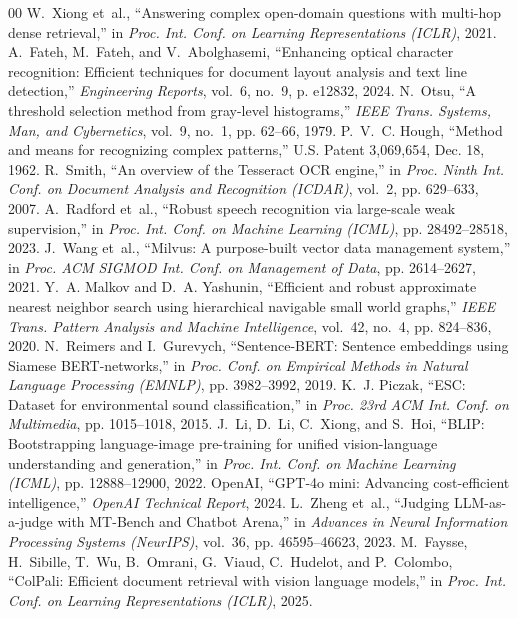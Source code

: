 \documentclass[conference]{IEEEtran}
\begin{document}
\begin{thebibliography}{00}
W.~Xiong et~al., ``Answering complex open-domain questions with multi-hop dense retrieval,'' in \emph{Proc. Int. Conf. on Learning Representations (ICLR)}, 2021.
A.~Fateh, M.~Fateh, and V.~Abolghasemi, ``Enhancing optical character recognition: Efficient techniques for document layout analysis and text line detection,'' \emph{Engineering Reports}, vol.~6, no.~9, p. e12832, 2024.
N.~Otsu, ``A threshold selection method from gray-level histograms,'' \emph{IEEE Trans. Systems, Man, and Cybernetics}, vol.~9, no.~1, pp. 62--66, 1979.
P.~V.~C. Hough, ``Method and means for recognizing complex patterns,'' U.S. Patent 3,069,654, Dec. 18, 1962.
R.~Smith, ``An overview of the Tesseract OCR engine,'' in \emph{Proc. Ninth Int. Conf. on Document Analysis and Recognition (ICDAR)}, vol.~2, pp. 629--633, 2007.
A.~Radford et~al., ``Robust speech recognition via large-scale weak supervision,'' in \emph{Proc. Int. Conf. on Machine Learning (ICML)}, pp. 28492--28518, 2023.
J.~Wang et~al., ``Milvus: A purpose-built vector data management system,'' in \emph{Proc. ACM SIGMOD Int. Conf. on Management of Data}, pp. 2614--2627, 2021.
Y.~A. Malkov and D.~A. Yashunin, ``Efficient and robust approximate nearest neighbor search using hierarchical navigable small world graphs,'' \emph{IEEE Trans. Pattern Analysis and Machine Intelligence}, vol.~42, no.~4, pp. 824--836, 2020.
N.~Reimers and I.~Gurevych, ``Sentence-BERT: Sentence embeddings using Siamese BERT-networks,'' in \emph{Proc. Conf. on Empirical Methods in Natural Language Processing (EMNLP)}, pp. 3982--3992, 2019.
K.~J. Piczak, ``ESC: Dataset for environmental sound classification,'' in \emph{Proc. 23rd ACM Int. Conf. on Multimedia}, pp. 1015--1018, 2015.
J.~Li, D.~Li, C.~Xiong, and S.~Hoi, ``BLIP: Bootstrapping language-image pre-training for unified vision-language understanding and generation,'' in \emph{Proc. Int. Conf. on Machine Learning (ICML)}, pp. 12888--12900, 2022.
OpenAI, ``GPT-4o mini: Advancing cost-efficient intelligence,'' \emph{OpenAI Technical Report}, 2024.
L.~Zheng et~al., ``Judging LLM-as-a-judge with MT-Bench and Chatbot Arena,'' in \emph{Advances in Neural Information Processing Systems (NeurIPS)}, vol.~36, pp. 46595--46623, 2023.
M.~Faysse, H.~Sibille, T.~Wu, B.~Omrani, G.~Viaud, C.~Hudelot, and P.~Colombo, ``ColPali: Efficient document retrieval with vision language models,'' in \emph{Proc. Int. Conf. on Learning Representations (ICLR)}, 2025.

\end{thebibliography}
\end{document}
